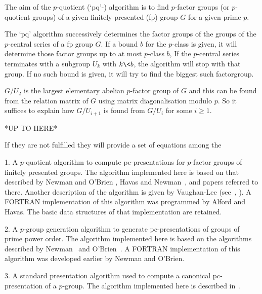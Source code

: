 
The aim of the $p$-quotient (`pq'-) algorithm is  to  find  $p$-factor
groups (or $p$-quotient groups) of a  given  finitely  presented  (fp)
group $G$ for a given prime $p$.

The `pq'  algorithm successively determines  the factor groups  of the
groups of the $p$-central series of a fp group $G$. If a bound $b$ for
the $p$-class is given, it will determine those factor groups up to at
most  $p$-class  $b$, If  the  $p$-central  series  terminates with  a
subgroup $U_k$ with $k \< b$, the algorithm will stop with that group.
If  no such  bound is  given, it  will try  to find  the  biggest such
factorgroup.

$G/U_2$ is the largest elementary  abelian $p$-factor group of $G$ and
this  can  be found  from  the relation  matrix  of  $G$ using  matrix
diagonalisation modulo $p$. So  it suffices to explain how $G/U_{i+1}$
is found from $G/U_i$ for some $i \ge 1$.

*UP TO HERE*

If they are  not fulfilled they will provide a  set of equations among
the 


\beginlist

\item{1.}
A $p$-quotient  algorithm  to  compute  pc-presentations  for  $p$-factor
groups of finitely presented groups. The algorithm  implemented  here  is
based on that described by Newman  and  O'Brien  \cite{NO96},  Havas  and
Newman~\cite{HN80}, and papers referred to there. Another description  of
the algorithm is given by Vaughan-Lee (see~\cite{Vau90a}, \cite{Vau90b}).
A FORTRAN implementation of this algorithm was programmed by  Alford  and
Havas. The basic data structures of that implementation are retained.

\item{2.} 
A $p$-group generation algorithm to generate pc-presentations  of  groups
of prime power order. The algorithm implemented  here  is  based  on  the
algorithms described by Newman~\cite{New77} and  O'Brien~\cite{OBr90}.  A
FORTRAN implementation of this algorithm was developed earlier by  Newman
and O'Brien.

\item{3.}
A  standard  presentation  algorithm  used   to   compute   a   canonical
pc-presentation  of  a  $p$-group.  The  algorithm  implemented  here  is
described in~\cite{OBr94}.


